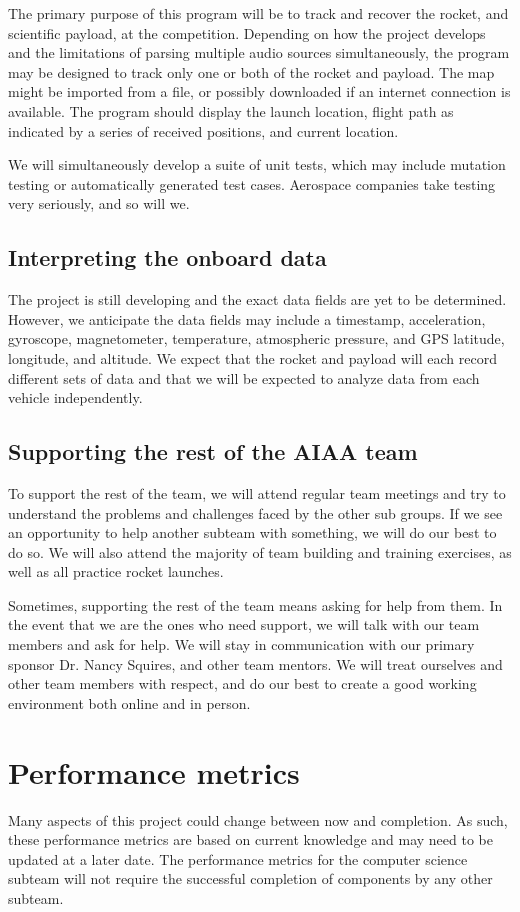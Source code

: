 \documentclass[onecolumn, draftclsnofoot,10pt, compsoc]{IEEEtran}
\begin{document}
The primary purpose of this program will be to track and recover the rocket, and scientific payload, at the competition.  Depending on how the project develops and the limitations of parsing multiple audio sources simultaneously, the program may be designed to track only one or both of the rocket and payload.  The map might be imported from a file, or possibly downloaded if an internet connection is available.  The program should display the launch location, flight path as indicated by a series of received positions, and current location.

We will simultaneously develop a suite of unit tests, which may include mutation testing or automatically generated test cases.  Aerospace companies take testing very seriously, and so will we.

\subsection{Interpreting the onboard data}
The project is still developing and the exact data fields are yet to be determined.  However, we anticipate the data fields may include a timestamp, acceleration, gyroscope, magnetometer, temperature, atmospheric pressure, and GPS latitude, longitude, and altitude.  We expect that the rocket and payload will each record different sets of data and that we will be expected to analyze data from each vehicle independently.

\subsection{Supporting the rest of the AIAA team}
To support the rest of the team, we will attend regular team meetings and try to understand the problems and challenges faced by the other sub groups.  If we see an opportunity to help another subteam with something, we will do our best to do so.  We will also attend the majority of team building and training exercises, as well as all practice rocket launches.

Sometimes, supporting the rest of the team means asking for help from them.  In the event that we are the ones who need support, we will talk with our team members and ask for help.  We will stay in communication with our primary sponsor Dr. Nancy Squires, and other team mentors.  We will treat ourselves and other team members with respect, and do our best to create a good working environment both online and in person.

\section{Performance metrics}
Many aspects of this project could change between now and completion. As such, these performance metrics are based on current knowledge and may need to be updated at a later date.  The performance metrics for the computer science subteam will not require the successful completion of components by any other subteam.
\end{document}
